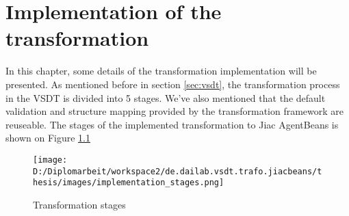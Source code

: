\chapter{Implementation of the transformation}
\label{chap:implementation}

In this chapter, some details of the transformation implementation will be presented. As mentioned before in section \ref{sec:vsdt}, the transformation process in the VSDT is divided into 5 stages. We've also mentioned that the default validation and structure mapping provided by the transformation framework are reuseable. The stages of the implemented transformation to Jiac AgentBeans is shown on Figure \ref{fig:implementation_stages}

\begin{figure}[h]
	\centering		\texttt{[image: D:/Diplomarbeit/workspace2/de.dailab.vsdt.trafo.jiacbeans/thesis/images/implementation\_stages.png]}
	\caption{Transformation stages}
	\label{fig:implementation_stages}
\end{figure}
